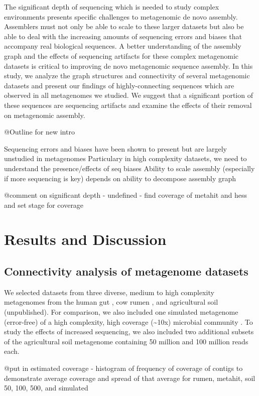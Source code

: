 \documentclass[11pt]{article} %
\begin{document}
The significant depth of sequencing which is needed to study complex environments presents specific challenges to metagenomic de novo assembly.  Assemblers must not only be able to scale to these larger datasets but also be able to deal with the increasing amounts of sequencing errors and biases that accompany real biological sequences.   A better understanding of the assembly graph and the effects of sequencing artifacts for these complex metagenomic datasets is critical to improving de novo metagenomic sequence assembly.  In this study, we analyze the graph structures and connectivity of several metagenomic datasets and present our findings of highly-connecting sequences which are observed in all metagenomes we studied.  We suggest that a significant portion of these sequences are sequencing artifacts and examine the effects of their removal on metagenomic assembly.

@Outline for new intro

Sequencing errors and biases have been shown to present but are largely unstudied in metagenomes
Particulary in high complexity datasets, we need to understand the presence/effects of seq biases
Ability to scale assembly (especially if more sequencing is key) depends on ability to decompose assembly graph

@comment on significant depth - undefined - find coverage of metahit and hess and set stage for coverage

\section{Results and Discussion}
\subsection{Connectivity analysis of metagenome datasets}

We selected datasets from three diverse, medium to high complexity metagenomes from the human gut \cite{Qin:2010p189}, cow rumen \cite{Hess:2011p686}, and agricultural soil (unpublished). For comparison, we also included one simulated metagenome (error-free) of a high complexity, high coverage (\textasciitilde{}10x) microbial community \cite{Pignatelli:2011p742}. To study the effects of increased sequencing, we also included two additional subsets of the agricultural soil metagenome containing 50 million and 100 million reads each. 

@put in estimated coverage - histogram of frequency of coverage of contigs to demonstrate average coverage and spread of that average for rumen, metahit, soil 50, 100, 500, and simulated
\end{document}
